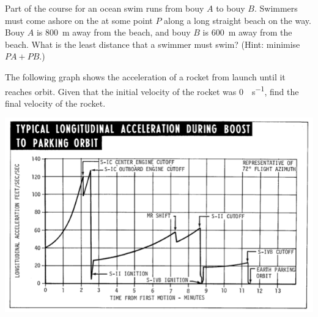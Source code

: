 \begin{questions}
  \question Part of the course for an ocean swim runs from bouy $ A $ to bouy $ B $. Swimmers must come ashore
            on the at some point $ P $ along a long straight beach on the way. Bouy $ A $ is \SI{800}{\metre} away
            from the beach, and bouy $ B $ is \SI{600}{\metre} away from the beach. What is the least distance that
            a swimmer must swim? (Hint: minimise $ PA + PB $.)
            \begin{center}
            \end{center}
  \question The following graph shows the acceleration of a rocket from launch until it reaches orbit. Given that the
            initial velocity of the rocket was \SI{0}{\foot\per\second}, find the final velocity of the rocket.
            \begin{center}
              \includegraphics[width=0.7\linewidth]{acceleration-time}
            \end{center}
\end{questions}

